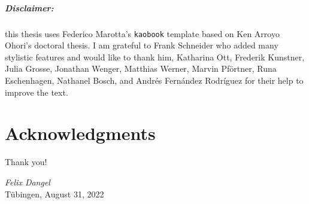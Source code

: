 {
  \thispagestyle{empty}
  \raggedright\null\vfill
  \paragraph{Disclaimer:} this thesis uses Federico Marotta's \texttt{kaobook}
  template based on Ken Arroyo Ohori's doctoral thesis. I am grateful to Frank
  Schneider who added many stylistic features and would like to thank him,
  Katharina Ott, Frederik Kunstner, Julia Grosse, Jonathan Wenger, Matthias
  Werner, Marvin Pf\"ortner, Runa Eschenhagen, Nathanel Bosch, and Andr\'es
  Fern\'andez Rodr\'iguez for their help to improve the text.
}
\cleardoublepage


\chapter{Acknowledgments}


\lipsum[66]

\lipsum[66]

\lipsum[66]

\lipsum[66]
\lipsum[66]
\lipsum[66]


\lipsum[66]

\lipsum[66]

\lipsum[66]

\lipsum[66]

Thank you!

\begin{flushright}
  \textit{Felix Dangel}\\
  T\"ubingen, August 31, 2022
\end{flushright}

